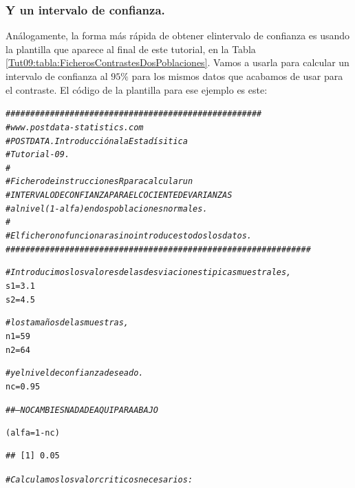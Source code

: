 \documentclass[10pt,a4paper]{article}\usepackage[]{graphicx}\usepackage[]{color}
\makeatletter
\newcommand{\hlnum}[1]{\textcolor[rgb]{0.686,0.059,0.569}{#1}}%
\newcommand{\hlcom}[1]{\textcolor[rgb]{0.678,0.584,0.686}{\textit{#1}}}%
\newcommand{\hlopt}[1]{\textcolor[rgb]{0,0,0}{#1}}%
\newcommand{\hlstd}[1]{\textcolor[rgb]{0.345,0.345,0.345}{#1}}%
\newcommand{\hlkwb}[1]{\textcolor[rgb]{0.69,0.353,0.396}{#1}}%
\newenvironment{kframe}{%
 \def\at@end@of@kframe{}%
 \ifinner\ifhmode%
  \def\at@end@of@kframe{\end{minipage}}%
  \begin{minipage}{\columnwidth}%
 \fi\fi%
 \def\FrameCommand##1{\hskip\@totalleftmargin \hskip-\fboxsep
 \colorbox{shadecolor}{##1}\hskip-\fboxsep
     \hskip-\linewidth \hskip-\@totalleftmargin \hskip\columnwidth}%
 \MakeFramed {\advance\hsize-\width
   \@totalleftmargin\z@ \linewidth\hsize
   \@setminipage}}%
 {\par\unskip\endMakeFramed%
 \at@end@of@kframe}
\newenvironment{knitrout}{}{} %
\newcounter {cont01}
\makeatother
\begin{document}
\subsubsection*{Y un intervalo de confianza.}

Análogamente, la forma más rápida de obtener elintervalo de confianza es usando la plantilla que aparece al final de este tutorial, en la Tabla \ref{Tut09:tabla:FicherosContrastesDosPoblaciones}. Vamos a usarla para calcular un intervalo de confianza al $95\%$ para los mismos datos que acabamos de usar para el contraste. El código de la plantilla para ese ejemplo es este:

\begin{knitrout}
\color{fgcolor}\begin{kframe}
\begin{alltt}
\hlcom{####################################################}
\hlcom{# www.postdata-statistics.com}
\hlcom{# POSTDATA. Introducción a la Estadísitica}
\hlcom{# Tutorial-09.}
\hlcom{#}
\hlcom{# Fichero de instrucciones R para calcular un}
\hlcom{# INTERVALO DE CONFIANZA PARA EL COCIENTE DE VARIANZAS}
\hlcom{# al nivel (1-alfa)   en dos poblaciones normales.}
\hlcom{#}
\hlcom{# El fichero no funcionara si no introduces todos los datos.}
\hlcom{##############################################################}


\hlcom{# Introducimos los valores de las desviaciones tipicas muestrales,}
\hlstd{s1} \hlkwb{=} \hlnum{3.1}
\hlstd{s2} \hlkwb{=} \hlnum{4.5}


\hlcom{# los tamaños de las muestras,}
\hlstd{n1} \hlkwb{=} \hlnum{59}
\hlstd{n2} \hlkwb{=} \hlnum{64}

\hlcom{# y el nivel de confianza deseado.}
\hlstd{nc} \hlkwb{=} \hlnum{0.95}

\hlcom{## --- NO CAMBIES NADA DE AQUI PARA ABAJO}

\hlstd{(alfa} \hlkwb{=} \hlnum{1} \hlopt{-} \hlstd{nc)}
\end{alltt}
\begin{verbatim}
## [1] 0.05
\end{verbatim}
\begin{alltt}
\hlcom{# Calculamos los valor criticos necesarios:}


\end{alltt}
\end{kframe}
\end{knitrout}
\end{document}
